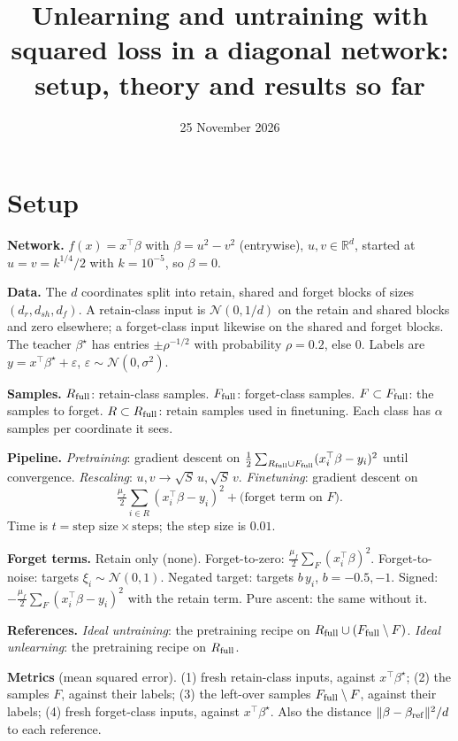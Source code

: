 \documentclass[10pt]{article}
\title{Unlearning and untraining with squared loss in a diagonal network:\\ setup, theory and results so far}
\author{}\date{25 November 2026}
\newcommand{\bs}{\beta^\star}\newcommand{\E}{\mathbb E}
\begin{document}
\maketitle

\section{Setup}
\textbf{Network.} $f(x)=x^\top\beta$ with $\beta=u^2-v^2$ (entrywise), $u,v\in\mathbb R^d$, started at $u=v=k^{1/4}/2$ with $k=10^{-5}$, so $\beta=0$.

\textbf{Data.} The $d$ coordinates split into retain, shared and forget blocks of sizes $(d_r,d_{sh},d_f)$. A retain-class input is $\mathcal N(0,1/d)$ on the retain and shared blocks and zero elsewhere; a forget-class input likewise on the shared and forget blocks. The teacher $\bs$ has entries $\pm\rho^{-1/2}$ with probability $\rho=0.2$, else $0$. Labels are $y=x^\top\bs+\varepsilon$, $\varepsilon\sim\mathcal N(0,\sigma^2)$.

\textbf{Samples.} $R_{\rm full}$: retain-class samples. $F_{\rm full}$: forget-class samples. $F\subset F_{\rm full}$: the samples to forget. $R\subset R_{\rm full}$: retain samples used in finetuning. Each class has $\alpha$ samples per coordinate it sees.

\textbf{Pipeline.} \emph{Pretraining}: gradient descent on $\frac12\sum_{R_{\rm full}\cup F_{\rm full}}(x_i^\top\beta-y_i)^2$ until convergence. \emph{Rescaling}: $u,v\to\sqrt S\,u,\sqrt S\,v$. \emph{Finetuning}: gradient descent on
\[
\tfrac{\mu_r}2\sum_{i\in R}(x_i^\top\beta-y_i)^2+\text{(forget term on $F$)} .
\]
Time is $t=\text{step size}\times\text{steps}$; the step size is $0.01$.

\textbf{Forget terms.} Retain only (none). Forget-to-zero: $\frac{\mu_f}2\sum_F(x_i^\top\beta)^2$. Forget-to-noise: targets $\xi_i\sim\mathcal N(0,1)$. Negated target: targets $b\,y_i$, $b=-0.5,-1$. Signed: $-\frac{\mu_f}2\sum_F(x_i^\top\beta-y_i)^2$ with the retain term. Pure ascent: the same without it.

\textbf{References.} \emph{Ideal untraining}: the pretraining recipe on $R_{\rm full}\cup(F_{\rm full}\setminus F)$. \emph{Ideal unlearning}: the pretraining recipe on $R_{\rm full}$.

\textbf{Metrics} (mean squared error). (1) fresh retain-class inputs, against $x^\top\bs$; (2) the samples $F$, against their labels; (3) the left-over samples $F_{\rm full}\setminus F$, against their labels; (4) fresh forget-class inputs, against $x^\top\bs$. Also the distance $\|\beta-\beta_{\rm ref}\|^2/d$ to each reference.
\end{document}

